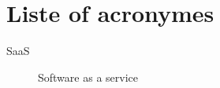 \chapter*{Liste of acronymes}

\begin{description}
\item[SaaS] Software as a service
\end{description}